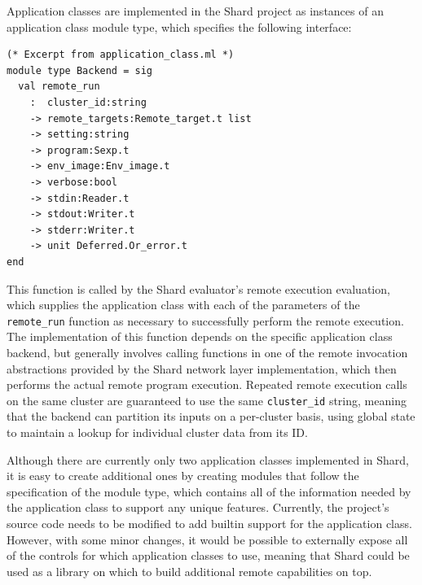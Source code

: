 \documentclass[twoside]{report}
\begin{document}

Application classes are implemented in the Shard project as instances of an application class module type, which specifies the following interface:

\begin{minipage}[c]{\textwidth-15pt}
  \begin{lstlisting}
(* Excerpt from application_class.ml *)
module type Backend = sig
  val remote_run
    :  cluster_id:string
    -> remote_targets:Remote_target.t list
    -> setting:string
    -> program:Sexp.t
    -> env_image:Env_image.t
    -> verbose:bool
    -> stdin:Reader.t
    -> stdout:Writer.t
    -> stderr:Writer.t
    -> unit Deferred.Or_error.t
end
\end{lstlisting}
  \smallskip
\end{minipage}

This function is called by the Shard evaluator's remote execution evaluation, which supplies the application class with each of the parameters of the \texttt{remote\_run} function as necessary to successfully perform the remote execution.
The implementation of this function depends on the specific application class backend, but generally involves calling functions in one of the remote invocation abstractions provided by the Shard network layer implementation, which then performs the actual remote program execution.
Repeated remote execution calls on the same cluster are guaranteed to use the same \texttt{cluster\_id} string, meaning that the backend can partition its inputs on a per-cluster basis, using global state to maintain a lookup for individual cluster data from its ID.

Although there are currently only two application classes implemented in Shard, it is easy to create additional ones by creating modules that follow the specification of the module type, which contains all of the information needed by the application class to support any unique features.
Currently, the project's source code needs to be modified to add builtin support for the application class. However, with some minor changes, it would be possible to externally expose all of the controls for which application classes to use, meaning that Shard could be used as a library on which to build additional remote capabilities on top.
\end{document}
